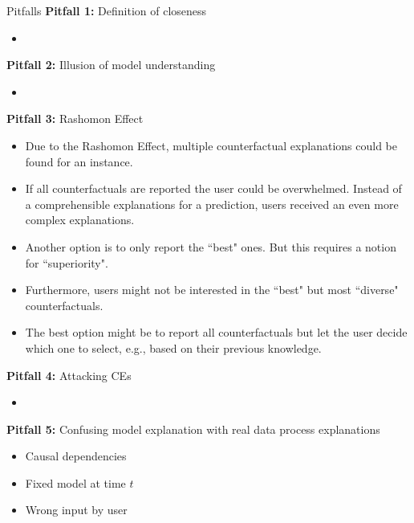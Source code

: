 \documentclass[11pt,compress,t,notes=noshow, xcolor=table]{beamer}
\begin{document}
\begin{vbframe}{Pitfalls}
	\textbf{Pitfall 1:} Definition of closeness
	\begin{itemize}
		\item 
	\end{itemize}
	\textbf{Pitfall 2:} Illusion of model understanding
	\begin{itemize}
		\item 
	\end{itemize}
	\textbf{Pitfall 3:} Rashomon Effect
	\begin{itemize}
		\item Due to the Rashomon Effect, multiple counterfactual explanations could be found for an instance. 
		\item If all counterfactuals are reported the user could be overwhelmed. Instead of a comprehensible explanations for a prediction, users received an even more complex explanations.
		\item Another option is to only report the ``best" ones. But this requires a notion for ``superiority".  
		\item Furthermore, users might not be interested in the ``best" but most ``diverse" counterfactuals.
		\item The best option might be to report all counterfactuals but let the user decide which one to select, e.g., based on their previous knowledge. 
	\end{itemize}
	\textbf{Pitfall 4:} Attacking CEs
	\begin{itemize}
		\item 
	\end{itemize}
	\textbf{Pitfall 5:} Confusing model explanation with real data process explanations
	\begin{itemize}
		\item Causal dependencies
		\item Fixed model at time $t$ 
		\item Wrong input by user
	\end{itemize}
\end{vbframe}
	
\endlecture
\end{document}
